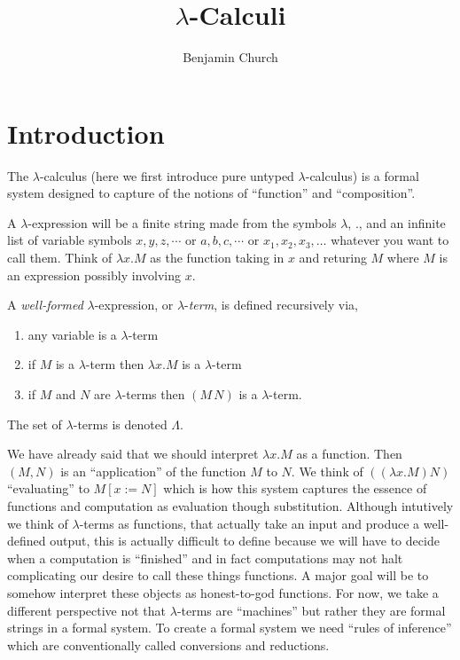 \documentclass[12pt]{article}
\begin{document}
\author{Benjamin Church}
\title{\Huge $\lambda$-Calculi}

\section{Introduction}


The $\lambda$-calculus (here we first introduce pure untyped $\lambda$-calculus) is a formal system designed to capture of the notions of ``function'' and ``composition''.

\begin{rmk}
A $\lambda$-expression will be a finite string made from the symbols $\lambda$, $.$, and an infinite list of variable symbols $x, y, z, \cdots$ or $a,b,c, \cdots$ or $x_1, x_2, x_3, \dots$ whatever you want to call them. Think of $\lambda x . M$ as the function taking in $x$ and returing $M$ where $M$ is an expression possibly involving $x$. 
\end{rmk} 

\begin{defn}
A \textit{well-formed} $\lambda$-expression, or $\lambda$-\textit{term}, is defined recursively via,
\begin{enumerate}
\item any variable is a $\lambda$-term
\item if $M$ is a $\lambda$-term then $\lambda x . M$ is a $\lambda$-term
\item if $M$ and $N$ are $\lambda$-terms then $(M \, N)$ is a $\lambda$-term.
\end{enumerate}
The set of $\lambda$-terms is denoted $\Lambda$.
\end{defn}

\begin{rmk}
We have already said that we should interpret $\lambda x . M$ as a function. Then $(M, N)$ is an ``application'' of the function $M$ to $N$. We think of $((\lambda x . M) N)$ ``evaluating'' to $M[x := N]$ which is how this system captures the essence of functions and computation as evaluation though substitution. Although intutively we think of $\lambda$-terms as functions, that actually take an input and produce a well-defined output, this is actually difficult to define because we will have to decide when a computation is ``finished'' and in fact computations may not halt complicating our desire to call these things functions. A major goal will be to somehow interpret these objects as honest-to-god functions. For now, we take a different perspective not that $\lambda$-terms are ``machines'' but rather they are formal strings in a formal system. To create a formal system we need ``rules of inference'' which are conventionally called conversions and reductions.
\end{rmk}
\end{document}
